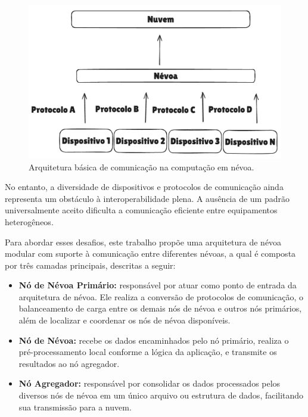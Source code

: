 \begin{figure}[htb]
	\caption{\label{fig:arquitetura_basica}Arquitetura básica de comunicação na computação em névoa.}
	\begin{center}
		\includegraphics[width=0.7\linewidth]{images/arquitetura_basica.png}
	\end{center}
\end{figure}

No entanto, a diversidade de dispositivos e protocolos de comunicação ainda representa um obstáculo à interoperabilidade plena. A ausência de um padrão universalmente aceito dificulta a comunicação eficiente entre equipamentos heterogêneos.

Para abordar esses desafios, este trabalho propõe uma arquitetura de névoa modular com suporte à comunicação entre diferentes névoas, a qual é composta por três camadas principais, descritas a seguir:

\begin{itemize}
    \item \textbf{Nó de Névoa Primário:} responsável por atuar como ponto de entrada da arquitetura de névoa. Ele realiza a conversão de protocolos de comunicação, o balanceamento de carga entre os demais nós de névoa e outros nós primários, além de localizar e coordenar os nós de névoa disponíveis.

    \item \textbf{Nó de Névoa:} recebe os dados encaminhados pelo nó primário, realiza o pré-processamento local conforme a lógica da aplicação, e transmite os resultados ao nó agregador.

    \item \textbf{Nó Agregador:} responsável por consolidar os dados processados pelos diversos nós de névoa em um único arquivo ou estrutura de dados, facilitando sua transmissão para a nuvem.
\end{itemize}

